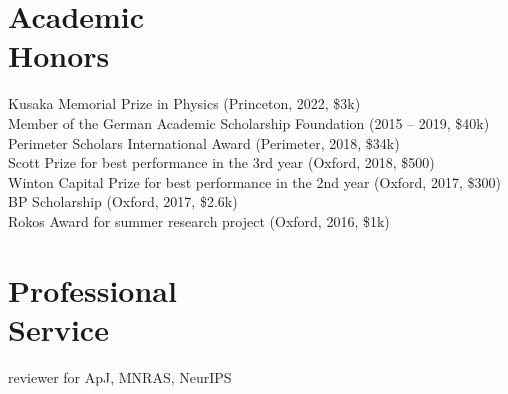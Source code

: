 \documentclass[margin]{res}
\begin{document}
\begin{resume}
\section{Academic \\ Honors}
Kusaka Memorial Prize in Physics (Princeton, 2022, \$3k)\\
Member of the German Academic Scholarship Foundation (2015 -- 2019, \$40k)\\
Perimeter Scholars International Award (Perimeter, 2018, \$34k)\\
Scott Prize for best performance in the 3rd year (Oxford, 2018, \$500)\\
Winton Capital Prize for best performance in the 2nd year (Oxford, 2017, \$300)\\
BP Scholarship (Oxford, 2017, \$2.6k)\\
Rokos Award for summer research project (Oxford, 2016, \$1k)\\

\section{Professional \\ Service}
reviewer for ApJ, MNRAS, NeurIPS

\end{resume}
\end{document}
